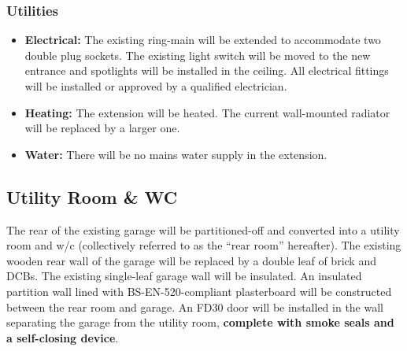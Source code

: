 \documentclass{extension}
\begin{document}
\subsubsection{Utilities}
\begin{itemize}
  \item {\bf Electrical:} The existing ring-main will be extended to accommodate two double plug sockets. The existing light switch will be moved to the new entrance and spotlights will be installed in the ceiling. All electrical fittings will be installed or approved by a qualified electrician.
  \item {\bf Heating:} The extension will be heated. The current wall-mounted radiator will be replaced by a larger one.
  \item {\bf Water:} There will be no mains water supply in the extension.
\end{itemize}

\subsection{Utility Room \& WC}
\label{utility}
The rear of the existing garage will be partitioned-off and converted into a utility room and w/c (collectively referred to as the ``rear room'' hereafter). The existing wooden rear wall of the garage will be replaced by a double leaf of brick and DCBs. The existing single-leaf garage wall will be insulated. An insulated partition wall lined with BS-EN-520-compliant plasterboard\cite{upboard} will be constructed between the rear room and garage. An FD30 door will be installed in the wall separating the garage from the utility room, {\bf complete with smoke seals and a self-closing device}.\cite{smokestrips,selfclose}
\end{document}
